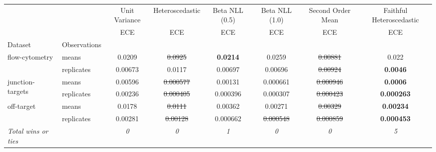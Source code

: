 \begin{tabular}{ll|c|c|c|c|c|c}
\toprule
{} & {} & {Unit Variance} & {Heteroscedastic} & {Beta NLL (0.5)} & {Beta NLL (1.0)} & {Second Order Mean} & {Faithful Heteroscedastic} \\
{} & {} & {ECE} & {ECE} & {ECE} & {ECE} & {ECE} & {ECE} \\
{Dataset} & {Observations} & {} & {} & {} & {} & {} & {} \\
\midrule
\multirow[t]{2}{*}{flow-cytometry} & means & 0.0209 & \sout{0.0925} & \textbf{0.0214} & 0.0259 & \sout{0.00881} & 0.022 \\
 & replicates & 0.00673 & 0.0117 & 0.00697 & 0.00696 & \sout{0.00924} & \textbf{0.0046} \\
\multirow[t]{2}{*}{junction-targets} & means & 0.00596 & \sout{0.000577} & 0.00131 & 0.000661 & \sout{0.000946} & \textbf{0.0006} \\
 & replicates & 0.00236 & \sout{0.000405} & 0.000396 & 0.000307 & \sout{0.000423} & \textbf{0.000263} \\
\multirow[t]{2}{*}{off-target} & means & 0.0178 & \sout{0.0111} & 0.00362 & 0.00271 & \sout{0.00329} & \textbf{0.00234} \\
 & replicates & 0.00281 & \sout{0.00128} & 0.000662 & \sout{0.000548} & \sout{0.000859} & \textbf{0.000453} \\
\textit{{Total wins or ties}} &  & \textit{0} & \textit{0} & \textit{1} & \textit{0} & \textit{0} & \textit{5} \\
\bottomrule
\end{tabular}
